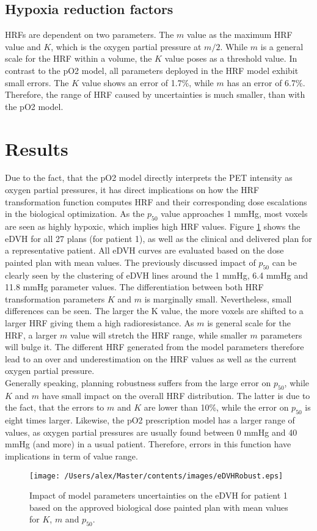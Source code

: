 \subsection{Hypoxia reduction factors}
HRFs are dependent on two parameters. The $m$ value as the maximum HRF value and $K$, which is the oxygen partial pressure at $m/2$. While $m$ is a general scale for the HRF within a volume, the $K$ value poses as a threshold value. In contrast to the pO2 model, all parameters deployed in the HRF model exhibit small errors. The $K$ value shows an error of 1.7\%, while $m$ has an error of 6.7\%. Therefore, the range of HRF caused by uncertainties is much smaller, than with the pO2 model.
\section{Results}
Due to the fact, that the pO2 model directly interprets the PET intensity as oxygen partial pressures, it has direct implications on how the HRF transformation function computes HRF and their corresponding dose escalations in the biological optimization. As the $p_{50}$ value approaches 1 mmHg, most voxels are seen as highly hypoxic, which implies high HRF values. Figure \ref{fig:eDVHRobust} shows the eDVH for all 27 plans (for patient 1), as well as the clinical and delivered plan for a representative patient. All eDVH curves are evaluated based on the dose painted plan with mean values. The previously discussed impact of $p_{50}$ can be clearly seen by the clustering of eDVH lines around the 1 mmHg, 6.4 mmHg and 11.8 mmHg parameter values. The differentiation between both HRF transformation parameters $K$ and $m$ is marginally small. Nevertheless, small differences can be seen. The larger the K value, the more voxels are shifted to a larger HRF giving them a high radioresistance. As $m$ is general scale for the HRF, a larger $m$ value will stretch the HRF range, while smaller $m$ parameters will bulge it. The different HRF generated from the model parameters therefore lead to an over and underestimation on the HRF values as well as the current oxygen partial pressure.\\Generally speaking, planning robustness suffers from the large error on $p_{50}$, while $K$ and $m$ have small impact on the overall HRF distribution. The latter is due to the fact, that the errors to $m$ and $K$ are lower than 10\%, while the error on $p_{50}$ is eight times larger. Likewise, the pO2 prescription model has a larger range of values, as oxygen partial pressures are usually found between 0 mmHg and 40 mmHg (and more) in a usual patient. Therefore, errors in this function have implications in term of value range.
\begin{figure}[htb]
\centering
\texttt{[image: /Users/alex/Master/contents/images/eDVHRobust.eps]}
\vspace{1cm}
\caption{Impact of model parameters uncertainties on the eDVH for patient 1 based on the approved biological dose painted plan with mean values for $K$, $m$ and $p_{50}$.}
\label{fig:eDVHRobust}
\end{figure}
